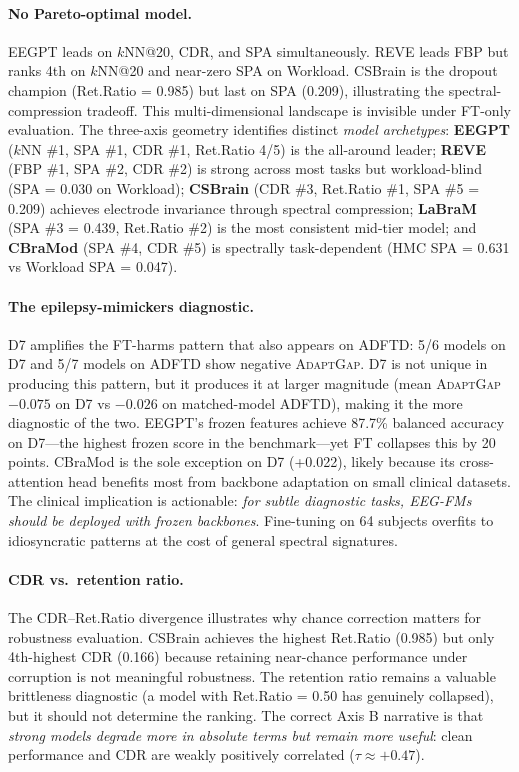 \documentclass{article}
\newcommand{\cdr}{\textsc{CDR}\xspace}
\newcommand{\adaptgap}{\textsc{AdaptGap}\xspace}
\begin{document}
\paragraph{No Pareto-optimal model.}
EEGPT leads on $k$NN@20, \cdr, and SPA simultaneously. REVE leads FBP but ranks 4th on $k$NN@20 and near-zero SPA on Workload. CSBrain is the dropout champion (Ret.Ratio = 0.985) but last on SPA (0.209), illustrating the spectral-compression tradeoff. This multi-dimensional landscape is invisible under FT-only evaluation. The three-axis geometry identifies distinct \emph{model archetypes}: \textbf{EEGPT} ($k$NN \#1, SPA \#1, CDR \#1, Ret.Ratio 4/5) is the all-around leader; \textbf{REVE} (FBP \#1, SPA \#2, CDR \#2) is strong across most tasks but workload-blind (SPA = 0.030 on Workload); \textbf{CSBrain} (CDR \#3, Ret.Ratio \#1, SPA \#5 = 0.209) achieves electrode invariance through spectral compression; \textbf{LaBraM} (SPA \#3 = 0.439, Ret.Ratio \#2) is the most consistent mid-tier model; and \textbf{CBraMod} (SPA \#4, CDR \#5) is spectrally task-dependent (HMC SPA = 0.631 vs Workload SPA = 0.047).

\paragraph{The epilepsy-mimickers diagnostic.}
D7 amplifies the FT-harms pattern that also appears on ADFTD: 5/6 models on D7 and 5/7 models on ADFTD show negative \adaptgap. D7 is not unique in producing this pattern, but it produces it at larger magnitude (mean \adaptgap $-0.075$ on D7 vs $-0.026$ on matched-model ADFTD), making it the more diagnostic of the two. EEGPT's frozen features achieve 87.7\% balanced accuracy on D7---the highest frozen score in the benchmark---yet FT collapses this by 20 points. CBraMod is the sole exception on D7 (+0.022), likely because its cross-attention head benefits most from backbone adaptation on small clinical datasets. The clinical implication is actionable: \emph{for subtle diagnostic tasks, EEG-FMs should be deployed with frozen backbones}. Fine-tuning on 64 subjects overfits to idiosyncratic patterns at the cost of general spectral signatures.

\paragraph{CDR vs.\ retention ratio.}
The CDR--Ret.Ratio divergence illustrates why chance correction matters for robustness evaluation. CSBrain achieves the highest Ret.Ratio (0.985) but only 4th-highest CDR (0.166) because retaining near-chance performance under corruption is not meaningful robustness. The retention ratio remains a valuable brittleness diagnostic (a model with Ret.Ratio = 0.50 has genuinely collapsed), but it should not determine the ranking. The correct Axis B narrative is that \emph{strong models degrade more in absolute terms but remain more useful}: clean performance and CDR are weakly positively correlated ($\tau \approx +0.47$).
\end{document}
